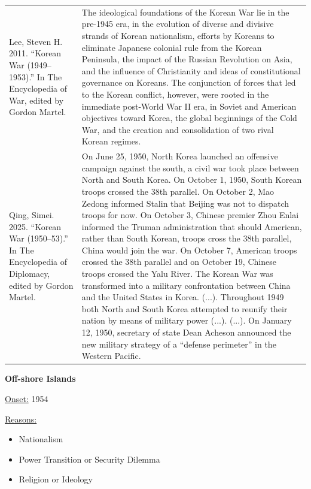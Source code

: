 {\begin{longtable}{p{}p{}}
\\
Lee, Steven H. 2011. “Korean War (1949–1953).” In The Encyclopedia of War, edited by Gordon Martel. & The ideological foundations of the Korean War lie in the pre-1945 era, in the evolution of diverse and divisive strands of Korean nationalism, efforts by Koreans to eliminate Japanese colonial rule from the Korean Peninsula, the impact of the Russian Revolution on Asia, and the influence of Christianity and ideas of constitutional governance on Koreans. The conjunction of forces that led to the Korean conflict, however, were rooted in the immediate post-World War II era, in Soviet and American objectives toward Korea, the global beginnings of the Cold War, and the creation and consolidation of two rival Korean regimes.
\\
Qing, Simei. 2025. “Korean War (1950–53).” In The Encyclopedia of Diplomacy, edited by Gordon Martel. & On June 25, 1950, North Korea launched an offensive campaign against the south, a civil war took place between North and South Korea. On October 1, 1950, South Korean troops crossed the 38th parallel. On October 2, Mao Zedong informed Stalin that Beijing was not to dispatch troops for now. On October 3, Chinese premier Zhou Enlai informed the Truman administration that should American, rather than South Korean, troops cross the 38th parallel, China would join the war. On October 7, American troops crossed the 38th parallel and on October 19, Chinese troops crossed the Yalu River. The Korean War was transformed into a military confrontation between China and the United States in Korea. (...). Throughout 1949 both North and South Korea attempted to reunify their nation by means of military power (...). (...). On January 12, 1950, secretary of state Dean Acheson announced the new military strategy of a “defense perimeter” in the Western Pacific.
\\
\end{longtable}}
\clearpage
         \textbf{Off-shore Islands} 

          \underline{Onset:} 1954         

\underline{Reasons:}
\begin{itemize}
\item Nationalism
\item Power Transition or Security Dilemma
\item Religion or Ideology
\end{itemize}

